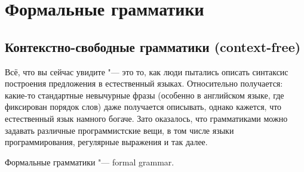 
\chapter{Формальные грамматики}
\section{Контекстно-свободные грамматики (context-free)}
Всё, что вы сейчас увидите "--- это то, как люди пытались описать синтаксис
построения предложения в естественный языках.
Относительно получается: какие-то стандартные невычурные фразы
(особенно в английском языке, где фиксирован порядок слов) даже получается
описывать, однако кажется, что естественный язык намного богаче.
Зато оказалось, что грамматиками можно задавать различные программистские
вещи, в том числе языки программирования, регулярные выражения и так далее.

\begin{Rem}
    Формальные грамматики "--- formal grammar.
\end{Rem}

